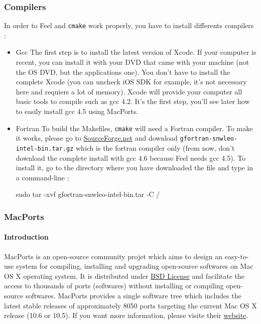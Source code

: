 \documentclass[a4paper]{book}
\newcommand{\feel}{Feel\xspace}
\newcommand{\cmake}{\texttt{cmake}\xspace}
\begin{document}
\subsubsection{Compilers}
In order to \feel and \cmake work properly, you have to install differents compilers :
\begin{itemize}
\item Gcc \newline
The first step is to install the latest version of Xcode. If your computer is recent, you can install it with your DVD that came with your machine (not the OS DVD, but the applications one). You don't have to install the complete Xcode (you can uncheck iOS SDK for example, it's not necessary here and requiers a lot of memory). Xcode will provide your computer all basic tools to compile such as gcc 4.2. It's the first step, you'll see later how to easily install gcc 4.5 using MacPorts.
\item Fortran \newline
To build the Makefiles, \cmake will need a Fortran compiler. To make it works, please go to \href{http://hpc.sourceforge.net/}{SourceForge.net} and download \verb|gfortran-snwleo-intel-bin.tar.gz| which is the fortran compiler only (from now, don't download the complete install with gcc 4.6 because Feel needs gcc 4.5). To install it, go to the directory where you have downloaded the file and type in a command-line : 
\begin{unixcom}
		sudo tar -xvf gfortran-snwleo-intel-bin.tar -C /
\end{unixcom}

\end{itemize}

\subsubsection{MacPorts}

\paragraph{Introduction} 
MacPorts is an open-source community projet which aims to design an easy-to-use system for compiling, installing and upgrading open-source softwares on Mac OS X operating system. It is distributed under \href{http://opensource.org/licenses/bsd-license.php}{BSD License} and facilitate the access to thousands of ports (softwares) without installing or compiling open-source softwares. \newline \newline
MacPorts provides a single software tree which includes the latest stable releases of approximately 8050 ports targeting the current Mac OS X release (10.6 or 10.5). If you want more information, please visite their \href{http://www.macports.org/}{website}.
\end{document}
